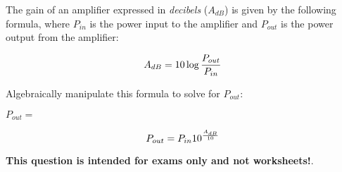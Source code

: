 

The gain of an amplifier expressed in {\it decibels} ($A_{dB}$) is given by the following formula, where $P_{in}$ is the power input to the amplifier and $P_{out}$ is the power output from the amplifier:
 
$$A_{dB} = 10 \log {P_{out} \over P_{in}}$$

Algebraically manipulate this formula to solve for $P_{out}$:

\vskip 20pt

$P_{out} = $







$$P_{out} = P_{in} 10^{A_{dB} \over 10}$$







{\bf This question is intended for exams only and not worksheets!}.



